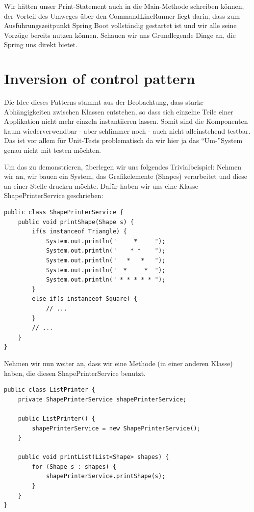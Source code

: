Wir hätten unser Print-Statement auch in die Main-Methode schreiben können, der
Vorteil des Umweges über den CommandLineRunner liegt darin, dass zum 
Ausführungszeitpunkt Spring Boot vollständig gestartet ist und wir alle seine
Vorzüge bereits nutzen können. Schauen wir uns Grundlegende Dinge an, die 
Spring uns direkt bietet.

\section{Inversion of control pattern}
Die Idee dieses Patterns stammt aus der Beobachtung, dass starke Abhängigkeiten
zwischen Klassen entstehen, so dass sich einzelne Teile einer Applikation 
nicht mehr einzeln instantiieren lassen. Somit sind die Komponenten kaum 
wiederverwendbar - aber schlimmer noch - auch nicht alleinstehend testbar. Das 
ist vor allem für Unit-Tests problematisch da wir hier ja das ``Um-''System genau
nicht mit testen möchten.

Um das zu demonstrieren, überlegen wir uns folgendes Trivialbeispiel: Nehmen
wir an, wir bauen ein System, das Grafikelemente (Shapes) verarbeitet und 
diese an einer Stelle drucken möchte. Dafür haben wir uns eine Klasse 
ShapePrinterService geschrieben:

\begin{listing}[H]
\begin{verbatim}
public class ShapePrinterService {
    public void printShape(Shape s) {
        if(s instanceof Triangle) {
            System.out.println("     *     ");
            System.out.println("    * *    ");
            System.out.println("   *   *   ");
            System.out.println("  *     *  ");
            System.out.println(" * * * * * ");
        }
        else if(s instanceof Square) {
            // ...
        }
        // ...
    }
}
\end{verbatim}
\caption{Shape printer in Java-Pseudocode}
\label{lst:shapePrint}
\end{listing}

Nehmen wir nun weiter an, dass wir eine Methode (in einer anderen Klasse) 
haben, die diesen ShapePrinterService benutzt.

\begin{listing}[H]
\begin{verbatim}
public class ListPrinter {
    private ShapePrinterService shapePrinterService;

    public ListPrinter() {
        shapePrinterService = new ShapePrinterService();
    }

    public void printList(List<Shape> shapes) {
        for (Shape s : shapes) {
            shapePrinterService.printShape(s);
        }
    }
}
\end{verbatim}
\caption{Invoking the ShapePrintServer Java-Pseudocode}
\label{lst:listPrint}
\end{listing}

